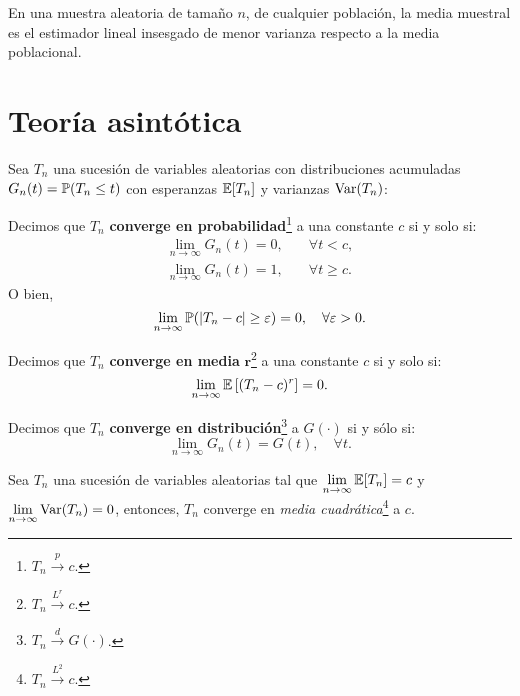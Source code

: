 \documentclass[8pt,a4paper]{extarticle}
\begin{document}
\begin{multicols}{3}
	\begin{boxtheo}
		En una muestra aleatoria de tamaño $n$, de cualquier población, la media muestral es el estimador lineal insesgado de menor varianza respecto a la media poblacional.
	\end{boxtheo}

	\newpage
	\section{Teoría asintótica}

	Sea $T_n$ una sucesión de variables aleatorias con distribuciones acumuladas $G_n(t) = \P(T_n \leq t)$ con esperanzas $\EE[T_n]$ y varianzas $\Var(T_n)$:

	\begin{boxdef}
		Decimos que $T_n$ \textbf{converge en probabilidad}\footnote{$\displaystyle T_n \overset{\displaystyle p}{\longrightarrow} c$.} a una constante $c$ si y solo si:
		\begin{align*}
			\lim_{n \to \infty} G_n(t) = 0, \quad & \forall t < c, \\
			\lim_{n \to \infty} G_n(t) = 1, \quad & \forall t \geq c.
		\end{align*}
		O bien,
		\[\lim_{n \to \infty} \P( \left| T_n - c \right| \geq \varepsilon ) = 0, \quad \forall \varepsilon > 0.\]
	\end{boxdef}

	\begin{boxdef}
		Decimos que $T_n$ \textbf{converge en media} $\bm r$\footnote{$\displaystyle T_n \overset{\displaystyle L^r}{\longrightarrow} c$.} a una constante $c$ si y solo si:
		\[\lim_{n \to \infty} \EE \left[ (T_n - c)^r \right] = 0.\]
	\end{boxdef}

	\begin{boxdef}
		Decimos que $T_n$ \textbf{converge en distribución}\footnote{$\displaystyle T_n \overset{\displaystyle d}{\longrightarrow} G(\cdot)$.} a $G(\cdot)$ si y sólo si:
		\[\lim_{n \to \infty} G_n(t) = G(t), \quad \forall t.\]
	\end{boxdef}

	\begin{boxcor}
		Sea $T_n$ una sucesión de variables aleatorias tal que $\displaystyle \lim_{n \to \infty} \EE[T_n] = c$ y $\displaystyle \lim_{n \to \infty} \Var(T_n) = 0$, entonces, $T_n$ converge en \emph{media cuadrática}\footnote{$T_n \overset{L^2}{\longrightarrow} c$.} a $c$.
	\end{boxcor}


\end{multicols}
\end{document}
